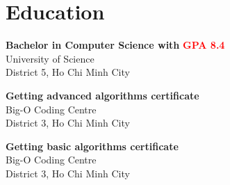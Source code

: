 \documentclass[a4paper,10pt]{article}
\begin{document}
\begin{adjustbox}{valign=t}
\begin{minipage}{0.3\textwidth}
\vfill

\section*{Education}
	\begin{description}
	\raggedright
	\item [\normalfont \textcolor{ColorOne}{2022.}] \textbf{Bachelor in Computer Science with} \textcolor{red}{\large\textbf{{GPA 8.4}}}\\ 
	University of Science \\
	District 5, Ho Chi Minh City

	\item [\normalfont \textcolor{ColorOne}{2019.}] \textbf{Getting advanced algorithms certificate}\\
	Big-O Coding Centre\\
	District 3, Ho Chi Minh City

	\item [\normalfont \textcolor{ColorOne}{2018.}] \textbf{Getting basic algorithms certificate}\\
	Big-O Coding Centre\\
	District 3, Ho Chi Minh City
\end{description}

\vfill
\end{minipage}
\end{adjustbox}
%
%
%
\hfill
\begin{adjustbox}{valign=t}
\begin{minipage}{0.05\textwidth} %
\MyVerticalRule  %
\end{minipage}
\end{adjustbox}
\hfill
%
\end{document}
